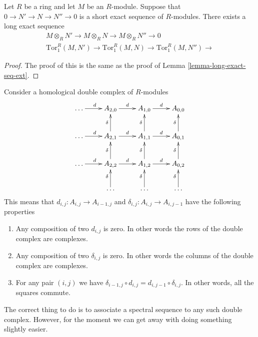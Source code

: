 \begin{lemma}
\label{lemma-long-exact-sequence-tor}
Let $R$ be a ring and let $M$ be an $R$-module.
Suppose that $0 \to N' \to N \to N'' \to 0$ is a short
exact sequence of $R$-modules. There exists a long
exact sequence
$$
\begin{matrix}
M \otimes_R N'
\to M\otimes_R N
\to M\otimes_R N''
\to 0
\\
\text{Tor}_1^R(M, N')
\to \text{Tor}_1^R(M, N)
\to \text{Tor}_1^R(M, N'')
\to
\end{matrix}
$$
\end{lemma}

\begin{proof}
The proof of this is the same as the proof of
Lemma \ref{lemma-long-exact-seq-ext}.
\end{proof}

\noindent
Consider a homological double complex of $R$-modules
$$
\xymatrix{
\ldots \ar[r]^d &
A_{2, 0} \ar[r]^d &
A_{1, 0} \ar[r]^d &
A_{0, 0} \cr
\ldots \ar[r]^d &
A_{2, 1} \ar[r]^d \ar[u]^\delta &
A_{1, 1} \ar[r]^d \ar[u]^\delta &
A_{0, 1} \ar[u]^\delta \cr
\ldots \ar[r]^d &
A_{2, 2} \ar[r]^d \ar[u]^\delta &
A_{1, 2} \ar[r]^d \ar[u]^\delta &
A_{0, 2} \ar[u]^\delta \cr
&
\ldots \ar[u]^\delta &
\ldots \ar[u]^\delta &
\ldots \ar[u]^\delta \cr
}
$$
This means that $d_{i, j} : A_{i, j} \to A_{i-1, j}$
and $\delta_{i, j} : A_{i, j} \to A_{i, j-1}$ have the following
properties
\begin{enumerate}
\item Any composition of two $d_{i, j}$ is zero. In other words
the rows of the double complex are complexes.
\item Any composition of two $\delta_{i, j}$ is zero. In other words
the columns of the double complex are complexes.
\item For any pair $(i, j)$ we have $\delta_{i-1, j} \circ d_{i, j}
= d_{i, j-1} \circ \delta_{i, j}$. In other words, all the squares
commute.
\end{enumerate}
The correct thing to do is to associate a spectral sequence to
any such double complex. However, for the moment we can get away with
doing something slightly easier.

